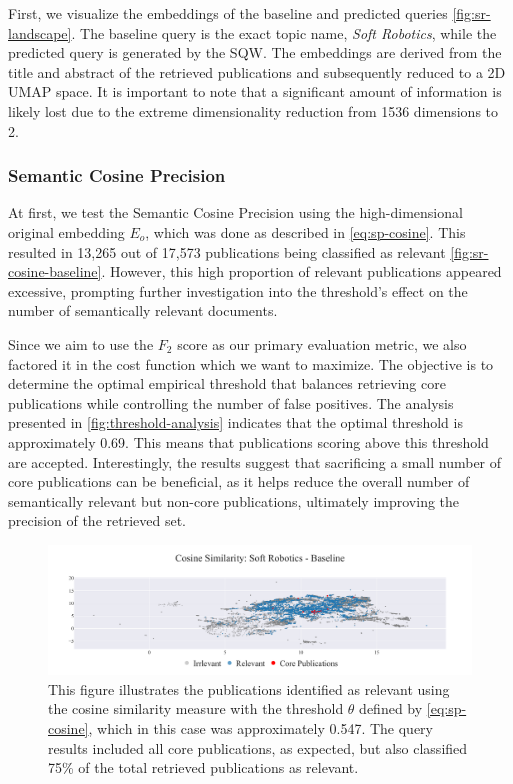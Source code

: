 First, we visualize the embeddings of the baseline and predicted queries \autoref{fig:sr-landscape}. The baseline query is the exact topic name, \textit{Soft Robotics}, while the predicted query is generated by the SQW. The embeddings are derived from the title and abstract of the retrieved publications and subsequently reduced to a 2D UMAP \autocite{Healy2024} space. It is important to note that a significant amount of information is likely lost due to the extreme dimensionality reduction from 1536 dimensions to 2.

\subsubsection{Semantic Cosine Precision}

At first, we test the Semantic Cosine Precision using the high-dimensional original embedding $E_o$, which was done as described in \autoref{eq:sp-cosine}. This resulted in 13,265 out of 17,573 publications being classified as relevant \autoref{fig:sr-cosine-baseline}. However, this high proportion of relevant publications appeared excessive, prompting further investigation into the threshold's effect on the number of semantically relevant documents.

Since we aim to use the $F_2$ score as our primary evaluation metric, we also factored it in the cost function which we want to maximize. The objective is to determine the optimal empirical threshold that balances retrieving core publications while controlling the number of false positives. The analysis presented in \autoref{fig:threshold-analysis} indicates that the optimal threshold is approximately 0.69. This means that publications scoring above this threshold are accepted. Interestingly, the results suggest that sacrificing a small number of core publications can be beneficial, as it helps reduce the overall number of semantically relevant but non-core publications, ultimately improving the precision of the retrieved set.

\begin{figure}[!ht]
	\hspace*{-1cm}	
	\includegraphics[scale=0.45]{pics/sr-cosine-baseline.pdf}
	\caption[Semantic Cosine Similarity: Soft Robotics]{This figure illustrates the publications identified as relevant using the cosine similarity measure with the threshold $\theta$ defined by \autoref{eq:sp-cosine}, which in this case was approximately 0.547. The query results included all core publications, as expected, but also classified 75\% of the total retrieved publications as relevant.}\label{fig:sr-cosine-baseline}
\end{figure}

